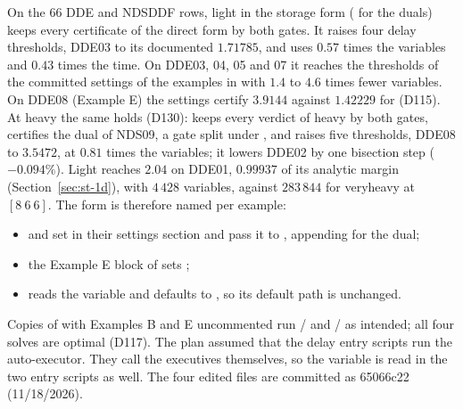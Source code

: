On the 66 DDE and NDSDDF rows, light in the storage form  ( for the duals) keeps every certificate of the direct form  by both gates. It raises four delay thresholds, DDE03 to its documented $1.71785$, and uses $0.57$ times the variables and $0.43$ times the time. On DDE03, 04, 05 and 07 it reaches the thresholds of the committed settings of the examples in  with $1.4$ to $4.6$ times fewer variables. On DDE08 (Example E) the  settings certify $3.9144$ against $1.42229$ for  (D115). At heavy the same holds (D130):  keeps every verdict of heavy  by both gates, certifies the dual of NDS09, a gate split under , and raises five thresholds, DDE08 to $3.5472$, at $0.81$ times the variables; it lowers DDE02 by one bisection step ($-0.094\%$). Light  reaches $2.04$ on DDE01, $0.99937$ of its analytic margin (Section~\ref{sec:st-1d}), with $4\,428$ variables, against $283\,844$ for veryheavy  at $[8\ 6\ 6]$. The form is therefore named per example:
\begin{itemize}\setlength\itemsep{0pt}
\item {} and  set  in their settings section and pass it to , appending  for the dual;
\item the Example E block of  sets ;
\item {} reads the variable and defaults to , so its default path is unchanged.
\end{itemize}
Copies of  with Examples B and E uncommented run / and / as intended; all four solves are optimal (D117). The plan assumed that the delay entry scripts run the auto-executor. They call the executives themselves, so the variable is read in the two entry scripts as well. The four edited files are committed as 65066c22 (11/18/2026).

